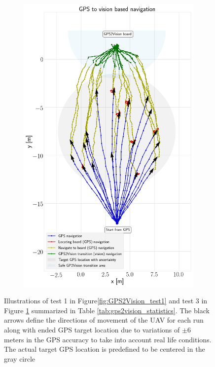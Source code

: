 \documentclass[../Head/report.tex]{subfiles}
\begin{document}
\begin{figure}[H]
\begin{subfigure}[t]{.45\textwidth}
        \includegraphics[width=\textwidth]{../Figures/GPS2Vision/test3_7-10ms_wind_20_runs/gps2vision.png}
        \caption{}
        \label{fig:GPS2Vision_test3}
    \end{subfigure}
    \caption{Illustrations of test 1 in Figure\ref{fig:GPS2Vision_test1} and test 3 in Figure \ref{fig:GPS2Vision_test3} summarized in Table \ref{tab:gps2vision_statistics}. The black arrows define the directions of movement of the UAV for each run along with ended GPS target location due to variations of $\pm 6$ meters in the GPS accuracy to take into account real life conditions. The actual target GPS location is predefined to be centered in the gray circle}
    \label{fig:GPS2Vision_test1_test3}
\end{figure}
\end{document}
